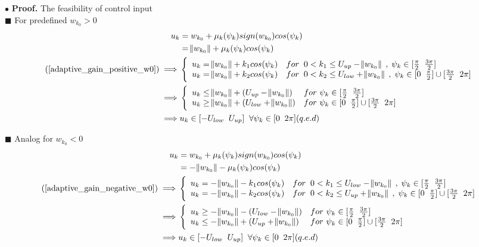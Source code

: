 \noindent $\bullet$ \textbf{Proof.} The feasibility of control input\\
\indent $\blacksquare$ For predefined ${w_{k_0} > 0}$ 
\begin{equation} \notag %
\begin{split}
u_{k} & = w_{k_0} + \mu_k(\psi_{k})sign(w_{k_0})cos(\psi_{k})\\
& = \norm{w_{k_0}} + \mu_k(\psi_{k})cos(\psi_{k})  \\
(\ref*{adaptive_gain_positive_w0}) \implies & \twopartdef {u_{k} = \norm{w_{k_0}} + k_1cos(\psi_{k})} {for \txtspc{ } 0 < k_1 \leq U_{up} - \norm{w_{k_0}} \txtspc{,}\psi_{k} \in [\frac{\pi}{2}  \txtspc{ } \frac{3\pi}{2}]}
{u_{k} = \norm{w_{k_0}} + k_2cos(\psi_{k})} {for \txtspc{ } 0 < k_2 \leq U_{low} + \norm{w_{k_0}} \txtspc{,} \psi_{k} \in [0 \txtspc{ } \frac{\pi}{2}] \cup [\frac{3\pi}{2}\txtspc{ } 2\pi]}\\
\implies & \twopartdef {u_{k} \leq \norm{w_{k_0}} + (U_{up} -\norm{w_{k_0}})} {for ${ }$ \psi_{k} \in [\frac{\pi}{2} \txtspc{ } \frac{3\pi}{2}]} {u_{k} \geq \norm{w_{k_0}} + (U_{low} + \norm{w_{k_0}})}   {for ${ }$ \psi_{k} \in [0 \txtspc{ } \frac{\pi}{2}] \cup [\frac{3\pi}{2} \txtspc{ } 2\pi]} \\
\implies & u_{k} \in [-U_{low} \txtspc{ } U_{up}] \txtspc{ } \forall \psi_{k} \in [0 \txtspc{ } 2\pi] (q.e.d) \\
\end{split}
\end{equation}

\indent $\blacksquare$ Analog for ${w_{k_0} < 0}$ 
\begin{equation} \notag %
\begin{split}
u_{k} & = w_{k_0} + \mu_k(\psi_{k})sign(w_{k_0})cos(\psi_{k})\\
& = -\norm{w_{k_0}} - \mu_k(\psi_{k})cos(\psi_{k})  \\
(\ref*{adaptive_gain_negative_w0}) \implies & \twopartdef {u_{k} = -\norm{w_{k_0}} - k_1cos(\psi_{k})} {for \txtspc{ } 0 < k_1 \leq U_{low} - \norm{w_{k_0}} \txtspc{,}\psi_{k} \in [\frac{\pi}{2}  \txtspc{ } \frac{3\pi}{2}]} 
{u_{k} = -\norm{w_{k_0}} - k_2cos(\psi_{k})} {for \txtspc{ } 0 < k_2 \leq U_{up} + \norm{w_{k_0}} \txtspc{,} \psi_{k} \in [0 \txtspc{ } \frac{\pi}{2}] \cup [\frac{3\pi}{2}\txtspc{ } 2\pi]}\\
\implies & \twopartdef {u_{k} \geq -\norm{w_{k_0}} - (U_{low} -\norm{w_{k_0}})} {for ${ }$ \psi_{k} \in [\frac{\pi}{2} \txtspc{ } \frac{3\pi}{2}]} {u_{k} \leq -\norm{w_{k_0}} + (U_{up} + \norm{w_{k_0}})}   {for ${ }$ \psi_{k} \in [0 \txtspc{ } \frac{\pi}{2}] \cup [\frac{3\pi}{2} \txtspc{ } 2\pi]} \\
\implies & u_{k} \in [-U_{low} \txtspc{ } U_{up}] \txtspc{ } \forall \psi_{k} \in [0 \txtspc{ } 2\pi] (q.e.d) \\
\end{split}
\end{equation}

